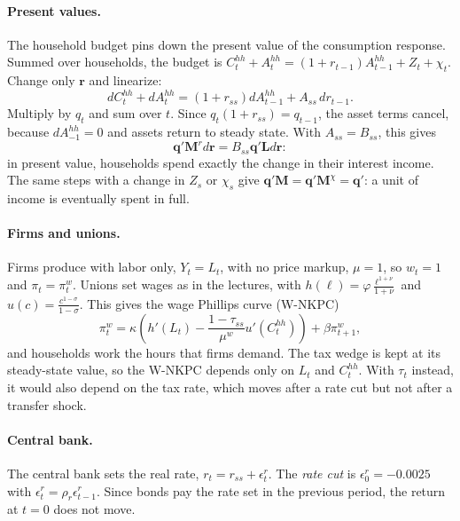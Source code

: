 \paragraph*{Present values.}
The household budget pins down the present value of the consumption response. Summed over households, the budget is $C_{t}^{hh}+A_{t}^{hh}=(1+r_{t-1})A_{t-1}^{hh}+Z_{t}+\chi_{t}$. Change only $\boldsymbol{r}$ and linearize:
$$dC_{t}^{hh}+dA_{t}^{hh}=(1+r_{ss})dA_{t-1}^{hh}+A_{ss}\,dr_{t-1}.$$
Multiply by $q_{t}$ and sum over $t$. Since $q_{t}(1+r_{ss})=q_{t-1}$, the asset terms cancel, because $dA_{-1}^{hh}=0$ and assets return to steady state. With $A_{ss}=B_{ss}$, this gives
\begin{equation}
\boldsymbol{q}'\boldsymbol{M}^{r}d\boldsymbol{r}=B_{ss}\boldsymbol{q}'\boldsymbol{L}d\boldsymbol{r}:\label{eq:pv_r}
\end{equation}
in present value, households spend exactly the change in their interest income. The same steps with a change in $Z_{s}$ or $\chi_{s}$ give $\boldsymbol{q}'\boldsymbol{M}=\boldsymbol{q}'\boldsymbol{M}^{\chi}=\boldsymbol{q}'$: a unit of income is eventually spent in full.

\paragraph*{Firms and unions.}
Firms produce with labor only, $Y_{t}=L_{t}$, with no price markup, $\mu=1$, so $w_{t}=1$ and $\pi_{t}=\pi^{w}_{t}$. Unions set wages as in the lectures, with $h(\ell)=\varphi\frac{\ell^{1+\nu}}{1+\nu}$ and $u(c)=\frac{c^{1-\sigma}}{1-\sigma}$. This gives the wage Phillips curve (W-NKPC)
\begin{equation}
\pi^{w}_{t}=\kappa\left(h'\left(L_{t}\right)-\frac{1-\tau_{ss}}{\mu^{w}}u'\left(C_{t}^{hh}\right)\right)+\beta\pi^{w}_{t+1},\label{eq:nkwc}
\end{equation}
and households work the hours that firms demand. The tax wedge is kept at its steady-state value, so the W-NKPC depends only on $L_{t}$ and $C_{t}^{hh}$. With $\tau_{t}$ instead, it would also depend on the tax rate, which moves after a rate cut but not after a transfer shock.

\paragraph*{Central bank.}
The central bank sets the real rate, $r_{t}=r_{ss}+\epsilon^{r}_{t}$. The \emph{rate cut} is $\epsilon^{r}_{0}=-0.0025$ with $\epsilon^{r}_{t}=\rho_{r}\epsilon^{r}_{t-1}$. Since bonds pay the rate set in the previous period, the return at $t=0$ does not move.

